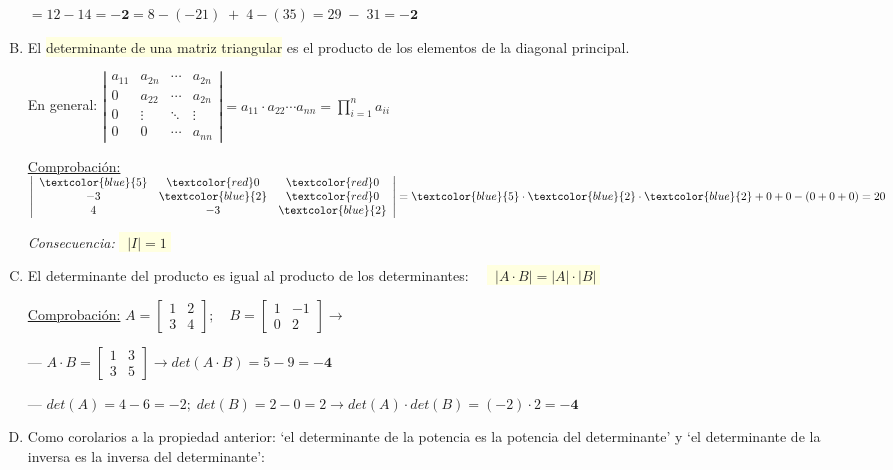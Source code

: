\begin{enumerate}[P.D. 1]
 $= 12-14 = \boldsymbol{-2}= 8-(-21) \; + \; 4-(35)=29\; - \; 31 =\boldsymbol{-2} $
 
 \item El \colorbox{LightYellow}{determinante de una matriz triangular} es el producto de los elementos de la diagonal principal.
 
 En general: $\displaystyle \left| \begin{array}{cccc} a_{11} & a_{2n} & \cdots  &a_{2n}  \\ 0&a_{22}&\cdots&a_{2n}        \\0&\vdots & \ddots & \vdots \\ 0 & 0& \cdots & a_{nn} \end{array} \right| =
 a_{11} \cdot a_{22} \cdots a_{nn}=\prod_{i=1}^n a_{ii}$
 
 \underline{Comprobación:} $\left| \begin{array}{ccc}
 \textcolor{blue}{5}&\textcolor{red}0&\textcolor{red}0\\ -3&\textcolor{blue}{2}&\textcolor{red}0 \\4&-3&\textcolor{blue}{2} \end{array} \right|= \textcolor{blue}{5} \cdot \textcolor{blue}{2} \cdot \textcolor{blue}{2} +0+0-(0+0+0)=20$	
 
 \emph{Consecuencia:} \colorbox{LightYellow}{$\; \boxed {\; |I|=1\; }$}
 
 \item El determinante del producto es igual al producto de los determinantes:
 $\quad$\colorbox{LightYellow}{$\; \boxed {\; |A\cdot B|= |A| \cdot |B| \; }$}

\underline{Comprobación:} $A=\left[ \begin{array}{cc} 1&2\\3&4 \end{array} \right]; \quad B=\left[ \begin{array}{cc} 1&-1\\0&2 \end{array} \right] \to$

\noindent --- $A\cdot B= \left[ \begin{array}{cc} 1&3\\3&5 \end{array} \right] \to det(A\cdot B)= 5-9=\boldsymbol{-4}$

\noindent --- $det(A)=4-6=-2; \; det(B)=2-0=2 \to det(A) \cdot det(B)=(-2)\cdot 2=\boldsymbol{-4}$  

\item Como corolarios a la propiedad anterior: `el determinante de la potencia es la potencia del determinante' y `el determinante de la inversa es la inversa del determinante':


\end{enumerate}
